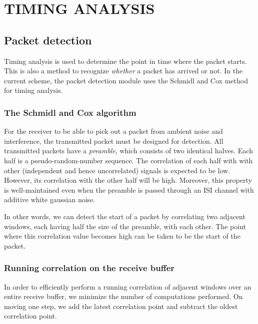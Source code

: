 \chapter{TIMING ANALYSIS}
\label{chap:timing}

\section{Packet detection}

Timing analysis is used to determine the point in time where the packet starts.
This is also a method to recognize \emph{whether} a packet has arrived or not.
In the current scheme, the packet detection module uses the Schmidl and Cox %
method for timing analysis.

\subsection{The Schmidl and Cox algorithm}

For the receiver to be able to pick out a packet from ambient noise and
interference, the transmitted packet must be designed for detection. All
transmitted packets have a \emph{preamble}, which consists of two identical
halves. Each half is a pseudo-random-number sequence. The correlation of each
half with with other (independent and hence uncorrelated) signals is expected
to be low. However, its correlation with the other half will be high. Moreover,
this property is well-maintained even when the preamble is passed through an
ISI channel with additive white gaussian noise.

In other words, we can detect the start of a packet by correlating two adjacent
windows, each having half the size of the preamble, with each other. The point
where this correlation value becomes high can be taken to be the start of the
packet.


\subsection{Running correlation on the receive buffer}

In order to efficiently perform a running correlation of adjacent windows over
an entire receive buffer, we minimize the number of computations performed. On
moving one step, we add the latest correlation point and subtract the oldest
correlation point.

